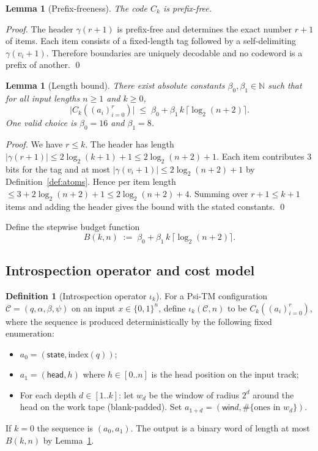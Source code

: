 \documentclass[11pt]{article}
\newtheorem{lemma}[theorem]{Lemma}
\theoremstyle{definition}
\newtheorem{definition}[theorem]{Definition}
\newcommand{\bits}{\{0,1\}}
\begin{document}
\begin{lemma}[Prefix-freeness]
\label{lem:prefixfree}
The code $C_k$ is prefix-free.
\end{lemma}

\begin{proof}
The header $\gamma(r+1)$ is prefix-free and determines the exact number $r+1$ of items. Each item consists of a fixed-length tag followed by a self-delimiting $\gamma(v_i+1)$. Therefore boundaries are uniquely decodable and no codeword is a prefix of another. \qed
\end{proof}

\begin{lemma}[Length bound]
\label{lem:length-bound}
There exist absolute constants $\beta_0,\beta_1\in\mathbb{N}$ such that for all input lengths $n\ge1$ and $k\ge0$,
\[
\big|C_k((a_i)_{i=0}^{r})\big|\;\le\; \beta_0 + \beta_1\,k\,\lceil\log_2(n+2)\rceil.
\]
One valid choice is $\beta_0=16$ and $\beta_1=8$.
\end{lemma}

\begin{proof}
We have $r\le k$. The header has length $|\gamma(r+1)|\le 2\log_2(k+1)+1\le 2\log_2(n+2)+1$. Each item contributes $3$ bits for the tag and at most $|\gamma(v_i+1)|\le 2\log_2(n+2)+1$ by Definition~\ref{def:atoms}. Hence per item length $\le 3+2\log_2(n+2)+1\le 2\log_2(n+2)+4$. Summing over $r+1\le k+1$ items and adding the header gives the bound with the stated constants. \qed
\end{proof}

Define the stepwise budget function
\begin{equation}
\label{eq:budget}
B(k,n)\;:=\;\beta_0 + \beta_1\,k\,\big\lceil\log_2(n+2)\big\rceil.
\end{equation}

\subsection{Introspection operator and cost model}

\begin{definition}[Introspection operator $\iota_k$]
\label{def:iota-k}
For a Psi-TM configuration $\mathcal{C}=(q,\alpha,\beta,\psi)$ on an input $x\in\bits^n$, define $\iota_k(\mathcal{C},n)$ to be $C_k((a_i)_{i=0}^{r})$, where the sequence is produced deterministically by the following fixed enumeration:
\begin{itemize}
  \item $a_0=(\textsf{state},\mathrm{index}(q))$;
  \item $a_1=(\textsf{head},h)$ where $h\in[0..n]$ is the head position on the input track;
  \item For each depth $d\in[1..k]$: let $w_d$ be the window of radius $2^d$ around the head on the work tape (blank-padded). Set $a_{1+d}=(\textsf{win}d,\#\{\text{ones in }w_d\})$.
\end{itemize}
If $k=0$ the sequence is $(a_0,a_1)$. The output is a binary word of length at most $B(k,n)$ by Lemma~\ref{lem:length-bound}.
\end{definition}
\end{document}
